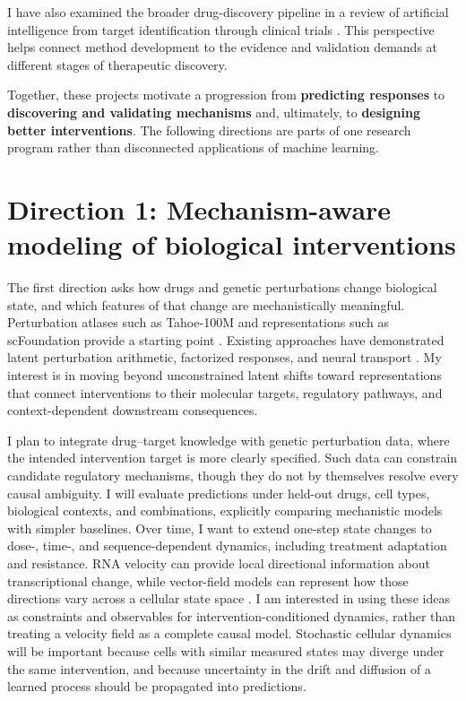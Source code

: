 \documentclass[11pt]{article}
\begin{document}
I have also examined the broader drug-discovery pipeline in a review of artificial intelligence from target identification through clinical trials \citep{inoue2026aidrugdiscovery}. This perspective helps connect method development to the evidence and validation demands at different stages of therapeutic discovery.

Together, these projects motivate a progression from \textbf{predicting responses} to \textbf{discovering and validating mechanisms} and, ultimately, to \textbf{designing better interventions}. The following directions are parts of one research program rather than disconnected applications of machine learning.

\section*{Direction 1: Mechanism-aware modeling of biological interventions}

The first direction asks how drugs and genetic perturbations change biological state, and which features of that change are mechanistically meaningful. Perturbation atlases such as Tahoe-100M and representations such as scFoundation provide a starting point \citep{zhang2025tahoe,hao2024scfoundation}. Existing approaches have demonstrated latent perturbation arithmetic, factorized responses, and neural transport \citep{lotfollahi2019scgen,lotfollahi2023cpa,bunne2023cellot}. My interest is in moving beyond unconstrained latent shifts toward representations that connect interventions to their molecular targets, regulatory pathways, and context-dependent downstream consequences.

I plan to integrate drug--target knowledge with genetic perturbation data, where the intended intervention target is more clearly specified. Such data can constrain candidate regulatory mechanisms, though they do not by themselves resolve every causal ambiguity. I will evaluate predictions under held-out drugs, cell types, biological contexts, and combinations, explicitly comparing mechanistic models with simpler baselines. Over time, I want to extend one-step state changes to dose-, time-, and sequence-dependent dynamics, including treatment adaptation and resistance. RNA velocity can provide local directional information about transcriptional change, while vector-field models can represent how those directions vary across a cellular state space \citep{lamanno2018velocity,qiu2022dynamo}. I am interested in using these ideas as constraints and observables for intervention-conditioned dynamics, rather than treating a velocity field as a complete causal model. Stochastic cellular dynamics will be important because cells with similar measured states may diverge under the same intervention, and because uncertainty in the drift and diffusion of a learned process should be propagated into predictions.
\end{document}
